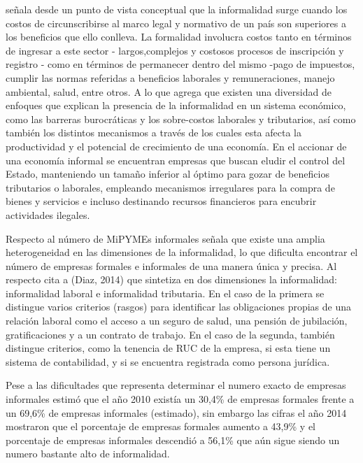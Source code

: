 \cite{loayza} señala desde un punto de vista conceptual que la informalidad surge
cuando los costos de circunscribirse al marco legal y normativo de un país son
superiores a los beneficios que ello conlleva. La formalidad involucra costos
tanto en términos de ingresar a este sector - largos,complejos y costosos procesos
de inscripción y registro - como en términos de permanecer dentro del mismo -pago
de impuestos, cumplir las normas referidas a beneficios laborales
y remuneraciones, manejo ambiental, salud, entre otros. A lo que \citep{penaranda}
agrega que existen una diversidad de enfoques que explican la presencia de la
informalidad en un sistema económico, como las barreras burocráticas y los sobre-costos
laborales y tributarios, así como también los distintos mecanismos a través de
los cuales esta afecta la productividad y el potencial de crecimiento de una
economía. En el accionar de una economía informal se encuentran empresas que
buscan eludir el control del Estado, manteniendo un tamaño inferior al óptimo
para gozar de beneficios tributarios o laborales, empleando mecanismos irregulares
para la compra de bienes y servicios e incluso destinando recursos financieros
para encubrir actividades ilegales.

Respecto al número de MiPYMEs informales \cite{produce2} señala que existe una
amplia heterogeneidad en las dimensiones de la informalidad, lo que dificulta
encontrar el número de empresas formales e informales de una manera única y precisa.
Al respecto \citep{produce2} cita a (Diaz, 2014) que sintetiza en dos dimensiones
la informalidad: informalidad laboral e informalidad tributaria. En el caso de la
primera se distingue varios criterios (rasgos) para identificar las obligaciones
propias de una relación laboral como el acceso a un seguro de salud, una pensión
de jubilación, gratificaciones y a un contrato de trabajo. En el caso de la segunda,
también distingue criterios, como la tenencia de RUC de la empresa, si esta tiene
un sistema de contabilidad, y si se encuentra registrada como persona jurídica.

Pese a las dificultades que representa determinar el numero exacto de empresas
informales \cite{produce2} estimó que el año 2010 existía un 30,4\% de empresas
formales frente a un 69,6\% de empresas informales (estimado), sin embargo las
cifras el año 2014 mostraron que el porcentaje de empresas formales aumento a 43,9\%
y el porcentaje de empresas informales descendió a 56,1\% que aún sigue siendo
un numero bastante alto de informalidad.

